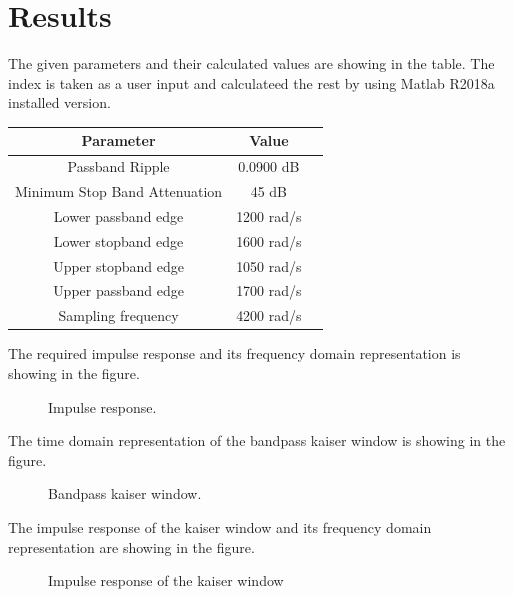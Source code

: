 \documentclass[twoside,12pt,times,onecolumn,a4paper]{report}
\begin{document}
\chapter{Results}
\hspace{4em}The given parameters and their calculated values are showing in the table. The index is taken as a user input and calculateed the rest by using Matlab R2018a installed version. 
\begin{center}
\begin{tabular}{ |c|c|c| } 
\hline
Parameter & Value \\
\hline
Passband Ripple & 0.0900 dB \\ 
Minimum Stop Band Attenuation & 45 dB\\ 
Lower passband edge & 1200 rad/s \\ 
Lower stopband edge & 1600 rad/s \\ 
Upper stopband edge & 1050 rad/s \\ 
Upper passband edge & 1700 rad/s \\ 
Sampling frequency & 4200 rad/s \\ 
\hline
\end{tabular}
\end{center}

The required impulse response and its frequency domain representation is showing in the figure.

\begin{figure}[H]
  \centering
   
  \caption{Impulse response.}
\end{figure}



The time domain representation of the bandpass kaiser window is showing in the figure.

\begin{figure}[H]
  \centering
    
  \caption{ Bandpass kaiser window.}
\end{figure}



The impulse response of the  kaiser window and its frequency domain representation are showing in the figure.

\begin{figure}[H]
  \centering
    
  \caption{ Impulse response of the  kaiser window}
\end{figure}
\end{document}

